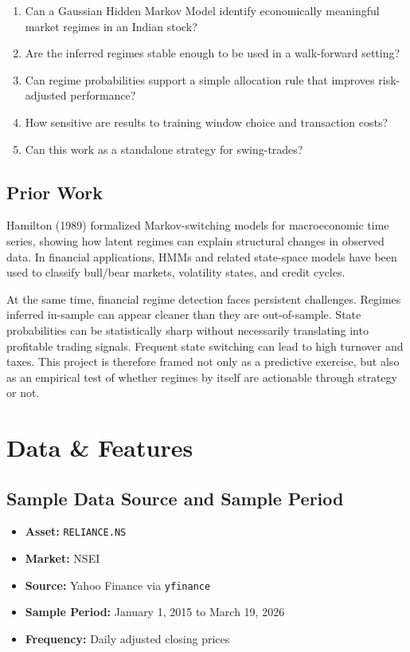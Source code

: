 \documentclass[11pt,a4paper]{article}
\begin{document}
\begin{enumerate}[label=\arabic*.]
    \item Can a Gaussian Hidden Markov Model identify economically meaningful market regimes in an Indian stock?
    \item Are the inferred regimes stable enough to be used in a walk-forward setting?
    \item Can regime probabilities support a simple allocation rule that improves risk-adjusted performance?
    \item How sensitive are results to training window choice and transaction costs?
    \item Can this work as a standalone strategy for swing-trades?
\end{enumerate}

\subsection{Prior Work}

Hamilton (1989) formalized Markov-switching models for macroeconomic time series, showing how latent regimes can explain structural changes in observed data. In financial applications, HMMs and related state-space models have been used to classify bull/bear markets, volatility states, and credit cycles.

At the same time, financial regime detection faces persistent challenges. Regimes inferred in-sample can appear cleaner than they are out-of-sample. State probabilities can be statistically sharp without necessarily translating into profitable trading signals. Frequent state switching can lead to high turnover and taxes. This project is therefore framed not only as a predictive exercise, but also as an empirical test of whether regimes by itself are actionable through strategy or not.

\section{Data \& Features}

\subsection{Sample Data Source and Sample Period}

\begin{itemize}
    \item \textbf{Asset:} \texttt{RELIANCE.NS}
    \item \textbf{Market:} NSEI
    \item \textbf{Source:} Yahoo Finance via \texttt{yfinance}
    \item \textbf{Sample Period:} January 1, 2015 to March 19, 2026
    \item \textbf{Frequency:} Daily adjusted closing prices
\end{itemize}
\end{document}
